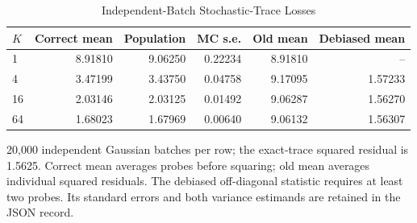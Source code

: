\begin{table}[tbp]
\centering
\caption{Independent-Batch Stochastic-Trace Losses}
\label{tab:trace}
\small
\begin{tabular}{@{}lrrrrr@{}}
\toprule
$K$ & Correct mean & Population & MC s.e. & Old mean & Debiased mean \\
\midrule
1 & 8.91810 & 9.06250 & 0.22234 & 8.91810 & -- \\
4 & 3.47199 & 3.43750 & 0.04758 & 9.17095 & 1.57233 \\
16 & 2.03146 & 2.03125 & 0.01492 & 9.06287 & 1.56270 \\
64 & 1.68023 & 1.67969 & 0.00640 & 9.06132 & 1.56307 \\
\bottomrule
\end{tabular}
\par\smallskip\begin{minipage}{\linewidth}\footnotesize 20,000 independent Gaussian batches per row; the exact-trace squared residual is 1.5625. Correct mean averages probes before squaring; old mean averages individual squared residuals. The debiased off-diagonal statistic requires at least two probes. Its standard errors and both variance estimands are retained in the JSON record.\end{minipage}
\end{table}
